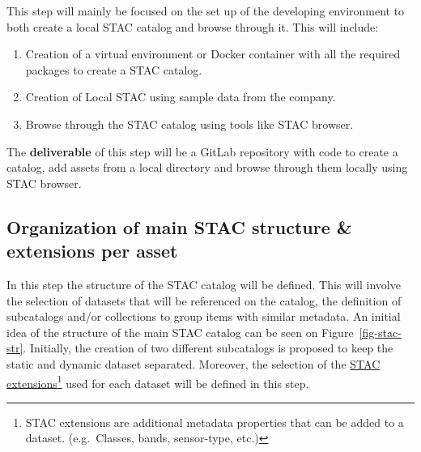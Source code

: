 \documentclass[
  oneside,
  open=any]{scrbook}
\providecommand{\tightlist}{%
  \setlength{\itemsep}{0pt}\setlength{\parskip}{0pt}}\usepackage{longtable,booktabs,array}
\begin{document}
This step will mainly be focused on the set up of the developing
environment to both create a local STAC catalog and browse through it.
This will include:

\begin{enumerate}
\def\labelenumi{\arabic{enumi}.}
\tightlist
\item
  Creation of a virtual environment or Docker container with all the
  required packages to create a STAC catalog.
\item
  Creation of Local STAC using sample data from the company.
\item
  Browse through the STAC catalog using tools like STAC browser.
\end{enumerate}

The \textbf{deliverable} of this step will be a GitLab repository with
code to create a catalog, add assets from a local directory and browse
through them locally using STAC browser.

\subsection{Organization of main STAC structure \& extensions per
asset}\label{sec-structure}

In this step the structure of the STAC catalog will be defined. This
will involve the selection of datasets that will be referenced on the
catalog, the definition of subcatalogs and/or collections to group items
with similar metadata. An initial idea of the structure of the main STAC
catalog can be seen on Figure~\ref{fig-stac-str}. Initially, the
creation of two different subcatalogs is proposed to keep the static and
dynamic dataset separated. Moreover, the selection of the
\href{https://stac-extensions.github.io/}{STAC extensions}\footnote{STAC
  extensions are additional metadata properties that can be added to a
  dataset. (e.g.~Classes, bands, sensor-type, etc.)} used for each
dataset will be defined in this step.
\end{document}

